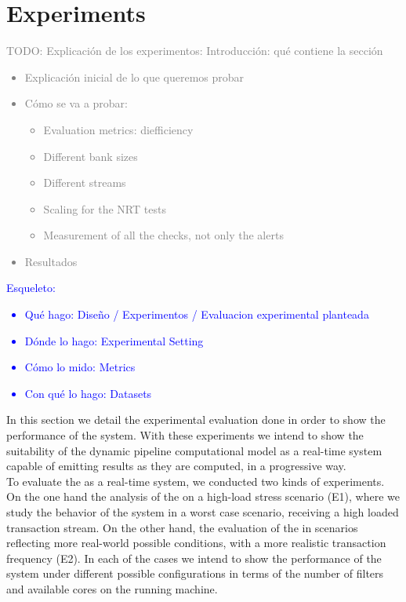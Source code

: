 \section{Experiments}





\textcolor{gray}{TODO: Explicación de los experimentos:
Introducción: qué contiene la sección
\begin{itemize}
    \item Explicación inicial de lo que queremos probar
    \item Cómo se va a probar:
    \begin{itemize}
        \item Evaluation metrics: diefficiency
        \item Different bank sizes
        \item Different streams
        \item Scaling for the NRT tests
        \item Measurement of all the checks, not only the alerts
    \end{itemize}
    \item Resultados
\end{itemize}
}

\textcolor{blue}{Esqueleto:
\begin{itemize}
    \item Qué hago: Diseño / Experimentos / Evaluacion experimental planteada
    \item Dónde lo hago: Experimental Setting
    \item Cómo lo mido: Metrics
    \item Con qué lo hago: Datasets
\end{itemize}
}

In this section we detail the experimental evaluation done in order to show the performance of the \DPATM system. With these experiments we intend to show the suitability of the dynamic pipeline computational model as a real-time system capable of emitting results as they are computed, in a progressive way.\\

To evaluate the \DPATM as a real-time system, we conducted two kinds of experiments. On the one hand the analysis of the \DPATM on a high-load stress scenario (E1), where we study the behavior of the system in a worst case scenario, receiving a high loaded transaction stream. On the other hand, the evaluation of the \DPATM in scenarios reflecting more real-world possible conditions, with a more realistic transaction frequency (E2). In each of the cases we intend to show the performance of the system under different possible configurations in terms of the number of filters and available cores on the running machine.\\


